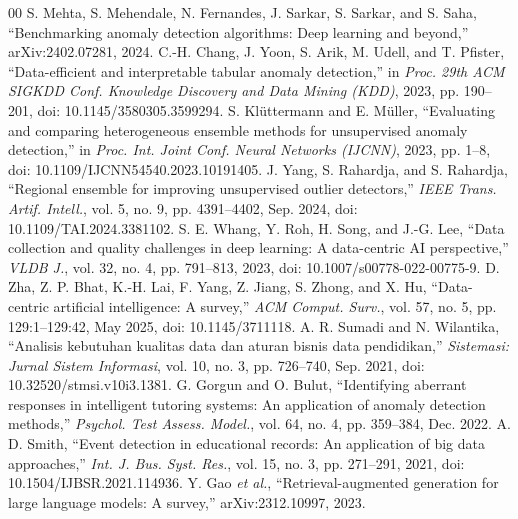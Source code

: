 \documentclass[conference]{IEEEtran}
\begin{document}
\begin{thebibliography}{00}
 S. Mehta, S. Mehendale, N. Fernandes, J. Sarkar, S. Sarkar, and S. Saha, ``Benchmarking anomaly detection algorithms: Deep learning and beyond,'' arXiv:2402.07281, 2024.
 C.-H. Chang, J. Yoon, S. Arik, M. Udell, and T. Pfister, ``Data-efficient and interpretable tabular anomaly detection,'' in \textit{Proc. 29th ACM SIGKDD Conf. Knowledge Discovery and Data Mining (KDD)}, 2023, pp. 190--201, doi: 10.1145/3580305.3599294.
 S. Kl\"uttermann and E. M\"uller, ``Evaluating and comparing heterogeneous ensemble methods for unsupervised anomaly detection,'' in \textit{Proc. Int. Joint Conf. Neural Networks (IJCNN)}, 2023, pp. 1--8, doi: 10.1109/IJCNN54540.2023.10191405.
 J. Yang, S. Rahardja, and S. Rahardja, ``Regional ensemble for improving unsupervised outlier detectors,'' \textit{IEEE Trans. Artif. Intell.}, vol. 5, no. 9, pp. 4391--4402, Sep. 2024, doi: 10.1109/TAI.2024.3381102.
 S. E. Whang, Y. Roh, H. Song, and J.-G. Lee, ``Data collection and quality challenges in deep learning: A data-centric AI perspective,'' \textit{VLDB J.}, vol. 32, no. 4, pp. 791--813, 2023, doi: 10.1007/s00778-022-00775-9.
 D. Zha, Z. P. Bhat, K.-H. Lai, F. Yang, Z. Jiang, S. Zhong, and X. Hu, ``Data-centric artificial intelligence: A survey,'' \textit{ACM Comput. Surv.}, vol. 57, no. 5, pp. 129:1--129:42, May 2025, doi: 10.1145/3711118.
 A. R. Sumadi and N. Wilantika, ``Analisis kebutuhan kualitas data dan aturan bisnis data pendidikan,'' \textit{Sistemasi: Jurnal Sistem Informasi}, vol. 10, no. 3, pp. 726--740, Sep. 2021, doi: 10.32520/stmsi.v10i3.1381.
 G. Gorgun and O. Bulut, ``Identifying aberrant responses in intelligent tutoring systems: An application of anomaly detection methods,'' \textit{Psychol. Test Assess. Model.}, vol. 64, no. 4, pp. 359--384, Dec. 2022.
 A. D. Smith, ``Event detection in educational records: An application of big data approaches,'' \textit{Int. J. Bus. Syst. Res.}, vol. 15, no. 3, pp. 271--291, 2021, doi: 10.1504/IJBSR.2021.114936.
 Y. Gao \textit{et al.}, ``Retrieval-augmented generation for large language models: A survey,'' arXiv:2312.10997, 2023.
\end{thebibliography}
\end{document}
